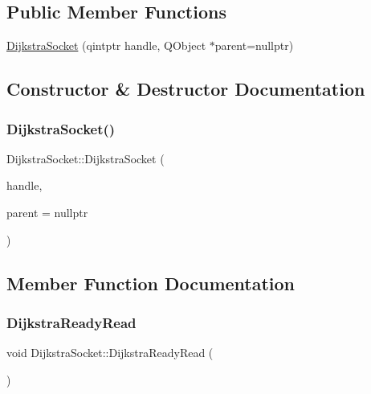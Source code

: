 \subsection*{Public Member Functions}
\begin{DoxyCompactItemize}
\item 
\hyperlink{class_dijkstra_socket_ab788220c12a6f985d5b036d69205b5e6}{Dijkstra\+Socket} (qintptr handle, Q\+Object $\ast$parent=nullptr)
\end{DoxyCompactItemize}


\subsection{Constructor \& Destructor Documentation}
\mbox{\label{class_dijkstra_socket_ab788220c12a6f985d5b036d69205b5e6}} 
\subsubsection{\texorpdfstring{Dijkstra\+Socket()}{DijkstraSocket()}}
{\footnotesize\ttfamily Dijkstra\+Socket\+::\+Dijkstra\+Socket (\begin{DoxyParamCaption}\item[{qintptr}]{handle,  }\item[{Q\+Object $\ast$}]{parent = {\ttfamily nullptr} }\end{DoxyParamCaption})}



\subsection{Member Function Documentation}
\mbox{\label{class_dijkstra_socket_ad942276d377f42992ac9dfd5fe32219c}} 
\subsubsection{\texorpdfstring{Dijkstra\+Ready\+Read}{DijkstraReadyRead}}
{\footnotesize\ttfamily void Dijkstra\+Socket\+::\+Dijkstra\+Ready\+Read (\begin{DoxyParamCaption}\item[{\hyperlink{class_dijkstra_socket}{Dijkstra\+Socket} $\ast$}]{ }\end{DoxyParamCaption})\hspace{0.3cm}{\ttfamily [signal]}}

